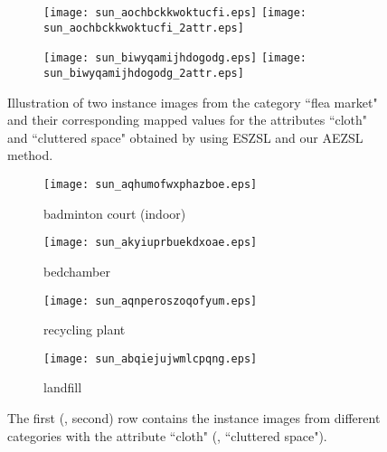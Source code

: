 \documentclass[journal]{IEEEtran}
\begin{document}
\setlength{\textfloatsep}{0pt}
\begin{figure}[t]
        \centering
        \begin{subfigure}[b]{0.49\textwidth}
                \texttt{[image: sun\_aochbckkwoktucfi.eps]}
                \texttt{[image: sun\_aochbckkwoktucfi\_2attr.eps]}                
        \end{subfigure}
        \begin{subfigure}[b]{0.49\textwidth}
                \texttt{[image: sun\_biwyqamijhdogodg.eps]}       
                \texttt{[image: sun\_biwyqamijhdogodg\_2attr.eps]}
        \end{subfigure}
        \caption{Illustration of two instance images from the category ``flea market" and their corresponding mapped values for the attributes ``cloth" and ``cluttered space" obtained by using ESZSL and our AEZSL method.}
        \label{fig:showcases}
\end{figure}
\setlength{\textfloatsep}{5pt}
\begin{figure}[t]
        \centering
        \begin{subfigure}[b]{0.2385\textwidth}
                \texttt{[image: sun\_aqhumofwxphazboe.eps]}
                \caption{badminton court (indoor)}
        \end{subfigure}
        \begin{subfigure}[b]{0.2415\textwidth}
                \texttt{[image: sun\_akyiuprbuekdxoae.eps]}
                \caption{bedchamber}
        \end{subfigure}
        \begin{subfigure}[b]{0.2234\textwidth}
                \texttt{[image: sun\_aqnperoszoqofyum.eps]}               
                \caption{recycling plant}
        \end{subfigure}
        \begin{subfigure}[b]{0.2566\textwidth}
                \texttt{[image: sun\_abqiejujwmlcpqng.eps]}
                \caption{landfill}
        \end{subfigure}
        \caption{The first (\resp, second) row contains the instance images from different categories with the attribute ``cloth" (\resp, ``cluttered space").}
        \label{fig:attributes}
\end{figure}
\end{document}
